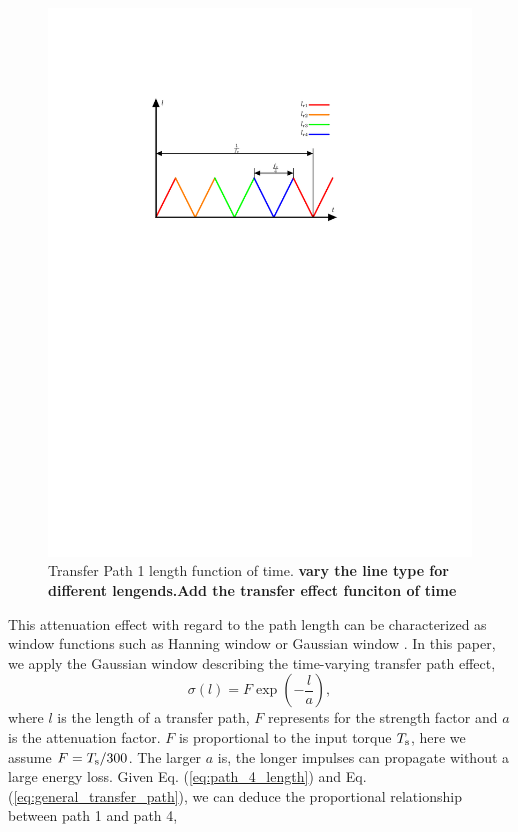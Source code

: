 \documentclass[a4paper,fleqn]{cas-sc}%
\begin{document}
\begin{figure}[pos=htbp]
    \centering
    \includegraphics[scale=0.5]{trangle_wave.pdf}
    \caption{Transfer Path 1 length function of time. \textbf{vary the line type for different lengends.Add the transfer effect funciton of time}}
    \label{fig:path_length_trangle_wave}
\end{figure}
\par This attenuation effect with regard to the path length can be characterized as window functions such as Hanning window or Gaussian window \cite{Mark2009}. In this paper, we apply the Gaussian window describing the time-varying transfer path effect,
\begin{equation}
    \sigma(l)=F\exp\left(-\frac{l}{a}\right),\label{eq:general_transfer_path}
\end{equation}
where $l$ is the length of a transfer path, $F$ represents for the strength factor and $a$ is the attenuation factor. $F$ is proportional to the input torque $T_{\rm s}$, here we assume $F=T_{\rm s}/300$. The larger $a$ is, the longer impulses can propagate without a large energy loss. Given Eq. (\ref{eq:path_4_length}) and Eq. (\ref{eq:general_transfer_path}), we can deduce the proportional relationship between path 1 and path 4,
\end{document}
